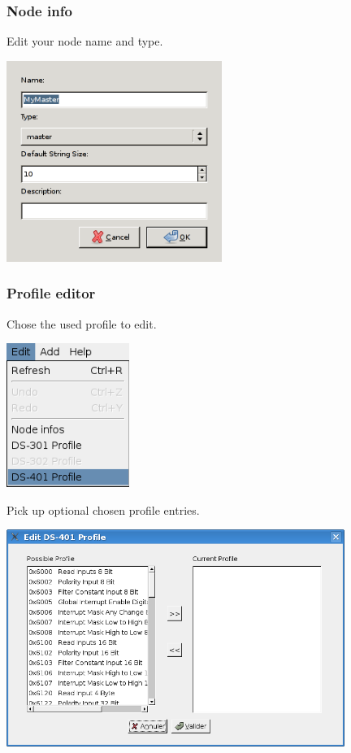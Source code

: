 \documentclass[12pt,english,a4paper]{book}
\begin{document}
\subsubsection{Node info}

Edit your node name and type.

\begin{center}
\includegraphics[width=7cm]{Pictures/node_info} 
\par\end{center}


\subsubsection{Profile editor}

Chose the used profile to edit.

\begin{center}
\includegraphics[width=4cm]{Pictures/10000000000000AB000000C88F594413} 
\par\end{center}

Pick up optional chosen profile entries.

\begin{center}
\includegraphics[width=11cm]{Pictures/10000201000002DE000001D82D89C224} 
\par\end{center}
\end{document}
